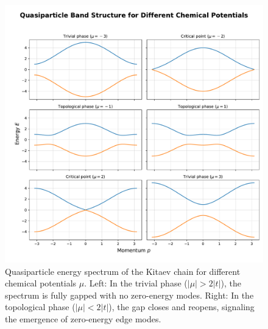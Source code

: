 \documentclass[11pt, letterpaper, titlepage]{article}
\begin{document}
\begin{figure}
  \includegraphics[width=1\textwidth]{../Figures/band_structure.pdf}
  \caption{Quasiparticle energy spectrum of the Kitaev chain for different chemical potentials $μ$. Left: In the trivial phase ($|μ| > 2|t|$), the spectrum is fully gapped with no zero-energy modes. Right: In the topological phase ($|μ| < 2|t|$), the gap closes and reopens, signaling the emergence of zero-energy edge modes.}
  \label{fig:kitaev_bands}
\end{figure}
\end{document}
